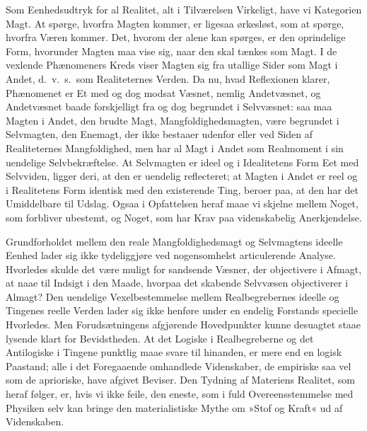 \documentclass[12pt]{book}
\newcommand{\apage}[1]{\marginnote{\footnotesize\textit{[#1]}}}
\begin{document}
Som Eenhedsudtryk for al Realitet, alt i Tilværelsen Virkeligt, have vi
Kategorien Magt. At spørge, hvorfra Magten kommer, er ligesaa ørkesløst,
som at spørge, hvorfra Væren kommer. Det, hvorom der alene kan spørges, er
den oprindelige Form, hvorunder Magten maa vise sig, naar den skal tænkes
som Magt. \apage{219} I de vexlende Phænomeners Kreds viser Magten sig fra utallige
Sider som Magt i Andet, d.\ v.\ s.\ som Realiteternes Verden. Da nu, hvad
Reflexionen klarer, Phænomenet er Et med og dog modsat Væsnet, nemlig
Andetvæsnet, og Andetvæsnet baade forskjelligt fra og dog begrundet i
Selvvæsnet: saa maa Magten i Andet, den brudte Magt, Mangfoldighedsmagten,
være begrundet i Selvmagten, den Enemagt, der ikke bestaaer udenfor eller
ved Siden af Realiteternes Mangfoldighed, men har al Magt i Andet som
Realmoment i sin uendelige Selvbekræftelse. At Selvmagten er ideel og i
Idealitetens Form Eet med Selvviden, ligger deri, at den er uendelig
reflecteret; at Magten i Andet er reel og i Realitetens Form identisk med
den existerende Ting, beroer paa, at den har det Umiddelbare til Udslag.
Ogsaa i Opfattelsen heraf maae vi skjelne mellem Noget, som forbliver
ubestemt, og Noget, som har Krav paa videnskabelig Anerkjendelse.

Grundforholdet mellem den reale Mangfoldighedsmagt og Selvmagtens ideelle
Eenhed lader sig ikke tydeliggjøre ved nogensomhelst articulerende Analyse.
Hvorledes skulde det være muligt for sandsende Væsner, der objectivere i
Afmagt, at naae til Indsigt i den Maade, hvorpaa det skabende Selvvæsen
objectiverer i Almagt? Den uendelige Vexelbestemmelse mellem Realbegrebernes
ideelle og Tingenes reelle Verden lader sig ikke henføre under en endelig
Forstands specielle Hvorledes. Men Forudsætningens afgjørende Hovedpunkter
kunne desuagtet staae lysende klart for Bevidstheden. At det Logiske i
Realbegreberne og \apage{220} det Antilogiske i Tingene punktlig maae svare til
hinanden, er mere end en logisk Paastand; alle i det Foregaaende omhandlede
Videnskaber, de empiriske saa vel som de aprioriske, have afgivet Beviser.
Den Tydning af Materiens Realitet, som heraf følger, er, hvis vi ikke
feile, den eneste, som i fuld Overeensstemmelse med Physiken selv kan
bringe den materialistiske Mythe om »Stof og Kraft« ud af Videnskaben.
\end{document}

